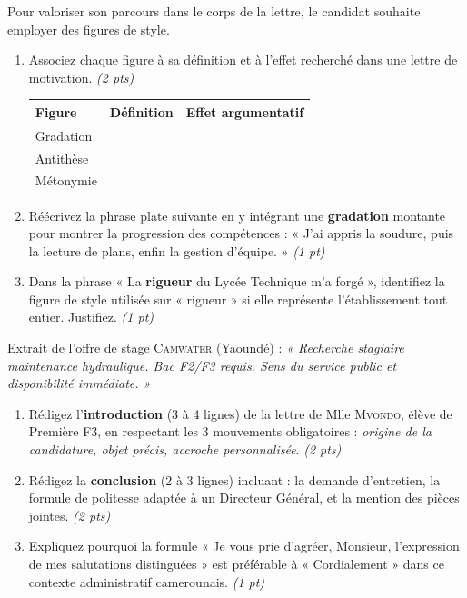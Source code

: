 \documentclass[11pt]{article}
\begin{document}
\begin{exercice}
Pour valoriser son parcours dans le corps de la lettre, le candidat souhaite employer des figures de style.

\begin{enumerate}
    \item Associez chaque figure à sa définition et à l'effet recherché dans une lettre de motivation. \textit{(2 pts)}
\begin{tabular}{|>{\raggedright\arraybackslash}p{3.5cm}|>{\raggedright\arraybackslash}p{5.5cm}|>{\raggedright\arraybackslash}p{5.5cm}|}
\hline
\textbf{Figure} & \textbf{Définition} & \textbf{Effet argumentatif} \\ \hline
Gradation & & \\ \hline
Antithèse & & \\ \hline
Métonymie & & \\ \hline
\end{tabular}

    \item Réécrivez la phrase plate suivante en y intégrant une \textbf{gradation} montante pour montrer la progression des compétences : « J'ai appris la soudure, puis la lecture de plans, enfin la gestion d'équipe. » \textit{(1 pt)}

    \item Dans la phrase « La \textbf{rigueur} du Lycée Technique m'a forgé », identifiez la figure de style utilisée sur « rigueur » si elle représente l'établissement tout entier. Justifiez. \textit{(1 pt)}
\end{enumerate}
\end{exercice}

\begin{exercice}
Extrait de l'offre de stage \textsc{Camwater} (Yaoundé) : \textit{« Recherche stagiaire maintenance hydraulique. Bac F2/F3 requis. Sens du service public et disponibilité immédiate. »}

\begin{enumerate}
    \item Rédigez l'\textbf{introduction} (3 à 4 lignes) de la lettre de Mlle \textsc{Mvondo}, élève de Première F3, en respectant les 3 mouvements obligatoires : \textit{origine de la candidature, objet précis, accroche personnalisée}. \textit{(2 pts)}

    \item Rédigez la \textbf{conclusion} (2 à 3 lignes) incluant : la demande d'entretien, la formule de politesse adaptée à un Directeur Général, et la mention des pièces jointes. \textit{(2 pts)}

    \item Expliquez pourquoi la formule « Je vous prie d'agréer, Monsieur, l'expression de mes salutations distinguées » est préférable à « Cordialement » dans ce contexte administratif camerounais. \textit{(1 pt)}
\end{enumerate}
\end{exercice}
\end{document}
